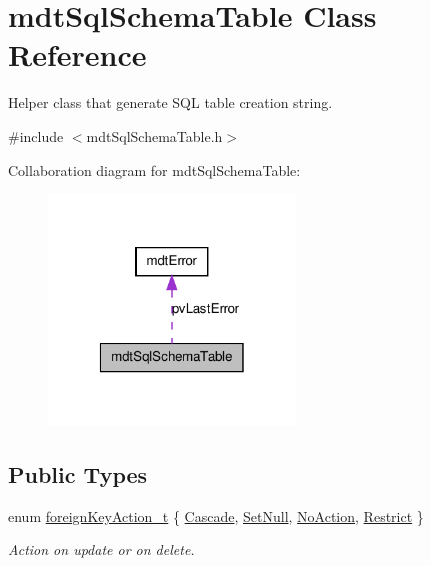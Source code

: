 \hypertarget{classmdt_sql_schema_table}{
\section{mdtSqlSchemaTable Class Reference}
\label{classmdt_sql_schema_table}
}


Helper class that generate SQL table creation string.  




{\ttfamily \#include $<$mdtSqlSchemaTable.h$>$}



Collaboration diagram for mdtSqlSchemaTable:
\nopagebreak
\begin{figure}[H]
\begin{center}
\leavevmode
\includegraphics[width=186pt]{classmdt_sql_schema_table__coll__graph}
\end{center}
\end{figure}
\subsection*{Public Types}
\begin{DoxyCompactItemize}
\item 
enum \hyperlink{classmdt_sql_schema_table_a1738e443f03dc69b914edb967cb911be}{foreignKeyAction\_\-t} \{ \hyperlink{classmdt_sql_schema_table_a1738e443f03dc69b914edb967cb911bea69dd241f7f53962080a7f2ba14a8a203}{Cascade}, 
\hyperlink{classmdt_sql_schema_table_a1738e443f03dc69b914edb967cb911bea1c16892bf8fa377f987abbb4d1c5644a}{SetNull}, 
\hyperlink{classmdt_sql_schema_table_a1738e443f03dc69b914edb967cb911bea88f6f3c8088eba177e18cb26f518d61d}{NoAction}, 
\hyperlink{classmdt_sql_schema_table_a1738e443f03dc69b914edb967cb911bea63478da446745c0346acfc6f5665abfe}{Restrict}
 \}
\begin{DoxyCompactList}\small\item\em Action on update or on delete. \end{DoxyCompactList}\end{DoxyCompactItemize}
